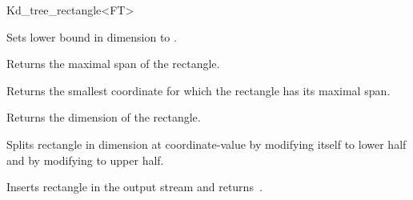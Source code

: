 \begin{ccRefClass}{Kd_tree_rectangle<FT>}
\begin{ccAdvanced}
{Sets lower bound in dimension  to .}
 
 
{Returns the maximal span of the rectangle.}

{Returns the smallest coordinate for which the rectangle has its maximal span.}

{Returns the dimension of the rectangle.}

{Splits rectangle in dimension  at coordinate-value  
 by modifying itself to lower half and by modifying  to upper half.} 


{Inserts rectangle  in the output stream  and returns~.}


\end{ccAdvanced}


\end{ccRefClass}


